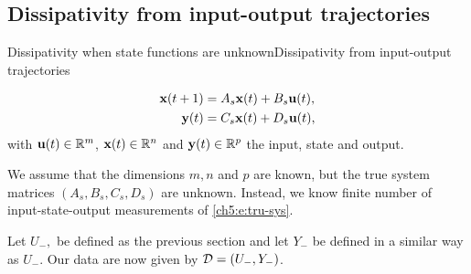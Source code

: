 \documentclass[aspectratio=169, handout, 10pt, hyperref=colorlinks]{beamer}
\begin{document}
\subsection{Dissipativity from input-output trajectories}
\begin{frame}[allowframebreaks]{Dissipativity when state functions are unknown}{Dissipativity from input-output trajectories}
    \begin{problem}
        \begin{equation}
            \begin{aligned}
            \mathbf{x}(t+1)&=A_{s} \mathbf{x}(t)+B_{s} \mathbf{u}(t),\\
            \mathbf{y}(t)&=C_{s} \mathbf{x}(t)+D_{s} \mathbf{u}(t),  \end{aligned}
        \end{equation}
    with $\mathbf{u}(t) \in \mathbb{R}^m$, $\mathbf{x}(t) \in \mathbb{R}^n$ and $\mathbf{y}(t) \in\mathbb{R}^{p}$ the input, state and output.

    We assume that the dimensions $m,n$ and $p$ are known, but the true system matrices $(A_{s}, B_{s},C_{s},D_{s})$ are unknown. Instead, we know finite number of input-state-output measurements of \eqref{ch5:e:tru-sys}.
    \end{problem}  
    Let $U_-,$ be defined as the previous section and let $Y_-$ be defined in a similar way as $U_-$. Our data are now given by $\mathcal{D} = (U_-,Y_-)$.
\end{frame}
\end{document}

